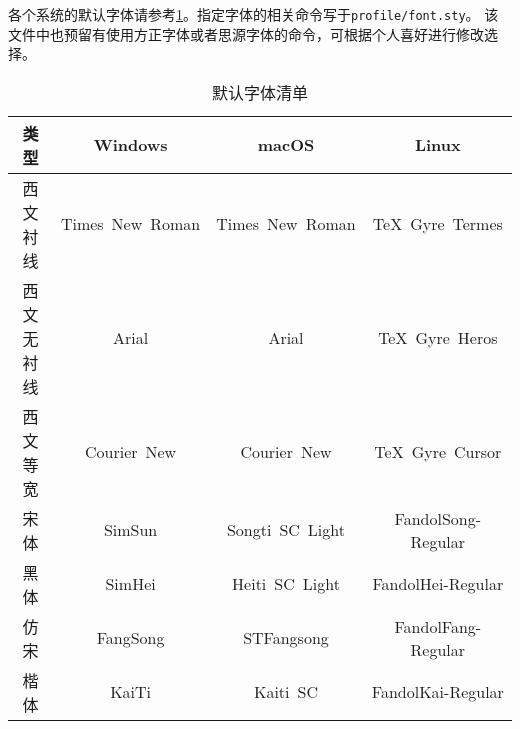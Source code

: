 各个系统的默认字体请参考\cref{tab:fontset}。指定字体的相关命令写于\texttt{profile/font.sty}。
该文件中也预留有使用方正字体或者思源字体的命令，可根据个人喜好进行修改选择。

\begin{table}[htbp]
    \caption{默认字体清单}
    \label{tab:fontset}
    \begin{tabular}{cccc}
        \toprule
        类型 & Windows & macOS & Linux \\
        \midrule
        西文衬线 & Times~New~Roman & Times~New~Roman & TeX~Gyre~Termes \\
        西文无衬线 & Arial & Arial & TeX~Gyre~Heros \\
        西文等宽 & Courier~New & Courier~New & TeX~Gyre~Cursor \\
        宋体 & SimSun & Songti~SC~Light &FandolSong-Regular \\
        黑体 & SimHei & Heiti~SC~Light & FandolHei-Regular \\
        仿宋 & FangSong & STFangsong & FandolFang-Regular \\
        楷体 & KaiTi & Kaiti~SC & FandolKai-Regular \\
        \bottomrule
    \end{tabular}
\end{table}
